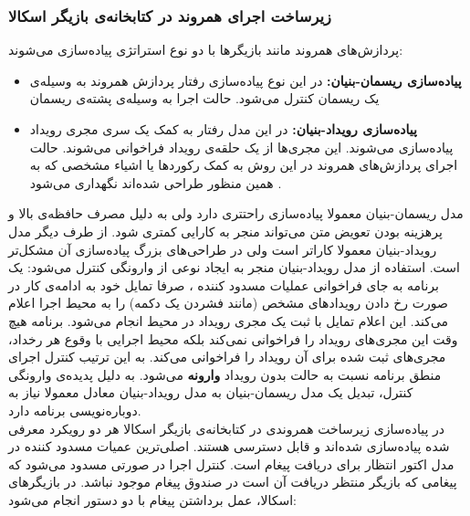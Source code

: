 \subsubsection{ زیرساخت اجرای همروند در کتابخانه‌ی بازیگر اسکالا}
\label{ref:receive_react}
پردازش‌های همروند مانند بازیگر‌ها با دو نوع استراتژی پیاده‌سازی می‌شوند:
\begin{itemize}
\item \textbf{پیاده‌سازی \gls{ریسمان-بنیان}:}
در این نوع پیاده‌سازی رفتار پردازش همروند به وسیله‌ی یک ریسمان کنترل می‌شود. حالت اجرا به وسیله‌ی  \gls{پشته}‌ی ریسمان\cite{concurrent_prog_java}

\item \textbf{پیاده‌سازی \gls{رویداد-بنیان}:}
در این مدل رفتار به کمک یک سری \gls{مجری رویداد} پیاده‌سازی می‌شوند. این مجری‌ها از یک حلقه‌ی رویداد فراخوانی می‌شوند. حالت اجرای پردازش‌های همروند در این روش به کمک رکورد‌ها یا اشیاء مشخصی که به همین منظور طراحی شده‌اند نگهداری می‌شود \cite{SEDA}.
\end{itemize}
مدل ریسمان-بنیان معمولا پیاده‌سازی راحتتری دارد ولی به دلیل مصرف حافظه‌ی بالا و پرهزینه بودن \gls{تعویض متن} می‌تواند منجر به کارایی کمتری شود\cite{WhyThreadsAreABadIdea}. از طرف دیگر مدل رویداد-بنیان معمولا کاراتر است ولی در طراحی‌های بزرگ پیاده‌سازی آن مشکل‌تر است\cite{whyevents}.
استفاده از مدل رویداد-بنیان منجر به ایجاد نوعی از \gls{وارونگی کنترل} می‌شود: یک برنامه به جای فراخوانی عملیات \gls{مسدود کننده} ، صرفا تمایل خود به ادامه‌ی کار در صورت رخ دادن رویدادهای مشخص (مانند فشردن یک دکمه) را به محیط اجرا اعلام می‌کند. این اعلام تمایل با ثبت یک مجری رویداد در محیط انجام می‌شود. برنامه هیچ وقت این مجری‌های رویداد را فراخوانی نمی‌کند بلکه محیط اجرایی با وقوع هر رخداد، مجری‌های ثبت شده برای آن رویداد را فراخوانی می‌کند. به این ترتیب کنترل اجرای منطق برنامه نسبت به حالت بدون رویداد \textbf{وارونه} می‌شود. به دلیل پدیده‌ی وارونگی کنترل، تبدیل یک مدل ریسمان-بنیان به مدل رویداد-بنیان معادل معمولا نیاز به دوباره‌نویسی برنامه دارد\cite{responders2006}.
\\
در پیاده‌سازی زیرساخت همروندی در کتابخانه‌ی بازیگر اسکالا هر دو رویکرد معرفی شده پیاده‌سازی شده‌اند و قابل دسترسی هستند. اصلی‌ترین عمیات مسدود کننده در مدل اکتور انتظار برای دریافت پیغام است. کنترل اجرا در صورتی مسدود می‌شود که پیغامی که بازیگر منتظر دریافت آن است در صندوق پیغام موجود نباشد. در بازیگر‌های اسکالا، عمل برداشتن پیغام با دو دستور انجام می‌شود:
